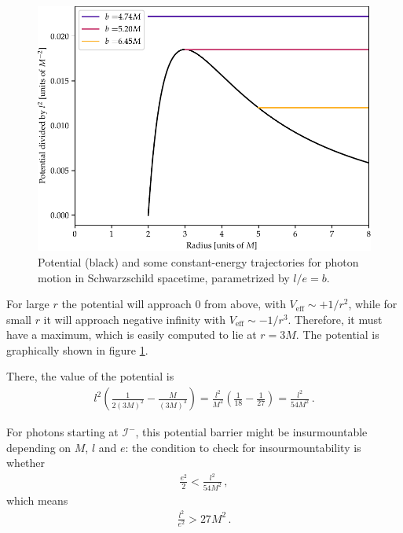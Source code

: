 \documentclass[main.tex]{subfiles}
\begin{document}
\begin{figure}[ht]
\centering
\includegraphics[width=\textwidth]{figures/effective_potential}
\caption{Potential (black) and some constant-energy trajectories for photon motion in Schwarzschild spacetime, parametrized by \(l/e = b\). }
\label{fig:effective_potential}
\end{figure}
    

For large \(r\) the potential will approach 0 from above, with \( V _{\text{eff}} \sim + 1/r^2\), 
while for small \(r\) it will approach negative infinity with \( V _{\text{eff}} \sim - 1/ r^3\).
Therefore, it must have a maximum, which is easily computed to lie at \(r = 3M\). 
The potential is graphically shown in figure \ref{fig:effective_potential}.

There, the value of the potential is
%
\begin{align}
l^2 \left( \frac{1}{2 (3M)^2} - \frac{M}{(3M)^3}\right) 
= \frac{l^2}{M^2} \left( \frac{1}{18} - \frac{1}{27} \right) = \frac{l^2}{54M^2}
\,.
\end{align}
%

For photons starting at \(\mathscr{I}^-\), 
this potential barrier might be insurmountable depending on \(M\), \(l\) and \(e\): 
the condition to check for insourmountability is whether 
%
\begin{align}
\frac{e^2}{2} < \frac{l^2}{54 M^2}
\,,
\end{align}
%
which means %
\begin{align}
\frac{l^2}{e^2} > 27M^2
\,.
\end{align}
\end{document}
